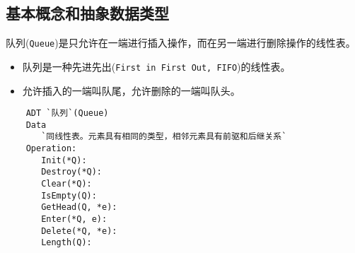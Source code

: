 
\subsection{基本概念和抽象数据类型}
\begin{frame}\ft{\subsecname} 
\begin{dingyi}
队列({\tt Queue})是只允许在一端进行插入操作，而在另一端进行删除操作的线性表。
\end{dingyi}
\end{frame}

\begin{frame}\ft{\subsecname} 
\begin{itemize}
\item 队列是一种先进先出({\tt First in First Out, FIFO})的线性表。\\[0.1in]
\item 允许插入的一端叫队尾，允许删除的一端叫队头。
\end{itemize}
\end{frame}

\begin{frame}\ft{\subsecname} 

\end{frame}

\begin{frame}[fragile]\ft{\subsecname} 
  \begin{lstlisting} 
    ADT `队列`(Queue)
    Data
       `同线性表。元素具有相同的类型，相邻元素具有前驱和后继关系`
    Operation:
       Init(*Q):
       Destroy(*Q):
       Clear(*Q):
       IsEmpty(Q):
       GetHead(Q, *e):
       Enter(*Q, e):
       Delete(*Q, *e):
       Length(Q):
  \end{lstlisting}
\end{frame}


